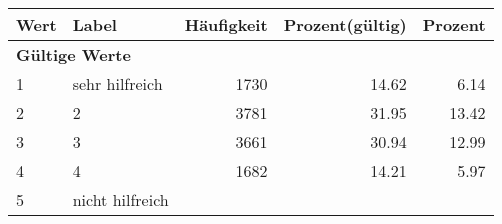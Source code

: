      \begin{longtable}{lXrrr}
     \toprule
     \textbf{Wert} & \textbf{Label} & \textbf{Häufigkeit} & \textbf{Prozent(gültig)} & \textbf{Prozent} \\
     \endhead
     \midrule
     \multicolumn{5}{l}{\textbf{Gültige Werte}}\\

     1 &
     \multicolumn{1}{X}{ sehr hilfreich   } &


       \num{1730} &
       \num[round-mode=places,round-precision=2]{14,62} &
         \num[round-mode=places,round-precision=2]{6,14} \\

     2 &
     \multicolumn{1}{X}{ 2   } &


       \num{3781} &
       \num[round-mode=places,round-precision=2]{31,95} &
         \num[round-mode=places,round-precision=2]{13,42} \\

     3 &
     \multicolumn{1}{X}{ 3   } &


       \num{3661} &
       \num[round-mode=places,round-precision=2]{30,94} &
         \num[round-mode=places,round-precision=2]{12,99} \\

     4 &
     \multicolumn{1}{X}{ 4   } &


       \num{1682} &
       \num[round-mode=places,round-precision=2]{14,21} &
         \num[round-mode=places,round-precision=2]{5,97} \\

     5 &
     \multicolumn{1}{X}{ nicht hilfreich   } &



\end{longtable}
